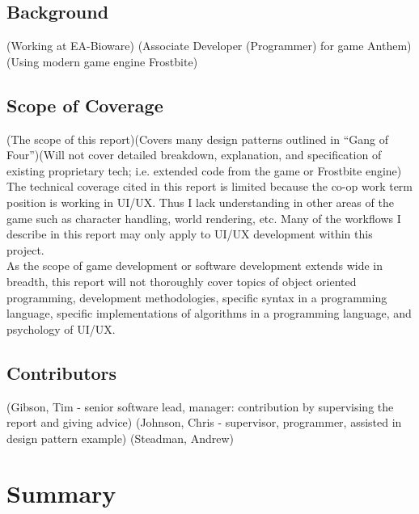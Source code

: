 \documentclass[10pt,letterpaper]{article}
\newcommand{\bs}{\bigskip}
\begin{document}
\subsection*{Background}

(Working at EA-Bioware)
(Associate Developer (Programmer) for game Anthem)
(Using modern game engine Frostbite)

\subsection*{Scope of Coverage}

(The scope of this report)(Covers many design patterns outlined in ``Gang of Four'')(Will not cover detailed breakdown, explanation, and specification of existing proprietary tech; i.e. extended code from the game or Frostbite engine)\bs
\\
The technical coverage cited in this report is limited because the co-op work term position is working in UI/UX. Thus I lack understanding in other areas of the game such as character handling, world rendering, etc. Many of the workflows I describe in this report may only apply to UI/UX development within this project.\bs
\\
As the scope of game development or software development extends wide in breadth, this report will not thoroughly cover topics of object oriented programming, development methodologies, specific syntax in a programming language, specific implementations of algorithms in a programming language, and psychology of UI/UX.

\subsection*{Contributors}

(Gibson, Tim - senior software lead, manager: contribution by supervising the report and giving advice) 
(Johnson, Chris - supervisor, programmer, assisted in design pattern example)
(Steadman, Andrew)

\newpage

\section*{Summary}
\newpage
\end{document}
